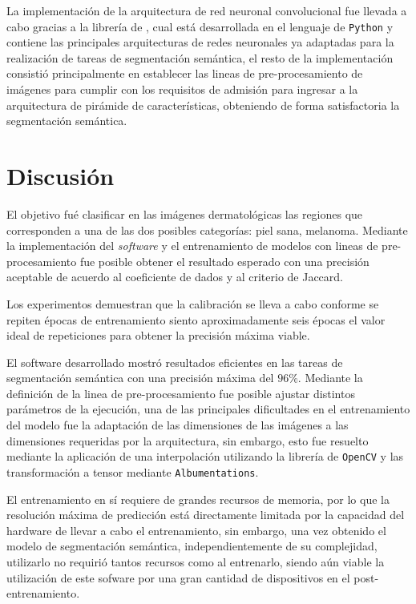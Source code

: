 La implementación de la arquitectura de red neuronal convolucional fue llevada a cabo gracias a la librería de \citet{Yakubovskiy:2019}, cual está desarrollada en el lenguaje de \texttt{Python} y contiene las principales arquitecturas de redes neuronales ya adaptadas para la realización de tareas de segmentación semántica, el resto de la implementación consistió principalmente en establecer las lineas de pre-procesamiento de imágenes para cumplir con los requisitos de admisión para ingresar a la arquitectura de pirámide de características, obteniendo de forma satisfactoria la segmentación semántica.

\section{Discusión}

El objetivo fué clasificar en las imágenes dermatológicas las regiones que corresponden a una de las dos posibles categorías: piel sana, melanoma. Mediante la implementación del \emph{software} y el entrenamiento de modelos con lineas de pre-procesamiento fue posible obtener el resultado esperado con una precisión aceptable de acuerdo al coeficiente de dados y al criterio de Jaccard.

Los experimentos demuestran que la calibración se lleva a cabo conforme se repiten épocas de entrenamiento siento aproximadamente seis épocas el valor ideal de repeticiones para obtener la precisión máxima viable.

El software desarrollado mostró resultados eficientes en las tareas de segmentación semántica con una precisión máxima del $96\%$. Mediante la definición de la linea de pre-procesamiento fue posible ajustar distintos parámetros de la ejecución, una de las principales dificultades en el entrenamiento del modelo fue la adaptación de las dimensiones de las imágenes a las dimensiones requeridas por la arquitectura, sin embargo, esto fue resuelto mediante la aplicación de una interpolación utilizando la librería de \texttt{OpenCV} y las transformación a tensor mediante \texttt{Albumentations}.

El entrenamiento en sí requiere de grandes recursos de memoria, por lo que la resolución máxima de predicción está directamente limitada por la capacidad del hardware de llevar a cabo el entrenamiento, sin embargo, una vez obtenido el modelo de segmentación semántica, independientemente de su complejidad, utilizarlo no requirió tantos recursos como al entrenarlo, siendo aún viable la utilización de este sofware por una gran cantidad de dispositivos en el post-entrenamiento. 


